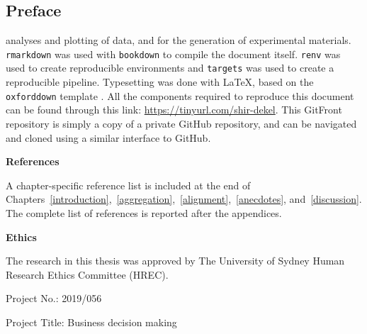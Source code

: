 \documentclass[a4paper, nobind]{templates/ociamthesis}
\newenvironment{preface}%
{   \begin{alwayssingle}\chapter*{Preface}
    \thispagestyle{empty}
    \pagestyle{empty}
    \setlength{\baselineskip}{\frontmatterbaselineskip}
  }
  {\end{alwayssingle}}
\theoremstyle{definition}
\theoremstyle{definition}
\theoremstyle{definition}
\theoremstyle{definition}
\theoremstyle{remark}
\begin{document}
\begin{romanpages}
\begin{preface}
  analyses and plotting of data, and for the generation of experimental materials.
  \texttt{rmarkdown} \autocite{xie2018} was used with \texttt{bookdown} \autocite{xie2016} to compile the
  document itself. \texttt{renv} \autocite{ushey2021} was used to create reproducible
  environments and \texttt{targets} \autocite{landau2021} was used to create a reproducible
  pipeline. Typesetting was done with \LaTeX, based on the \texttt{oxforddown} template
  \autocite{lyngs2019}. All the components required to reproduce this document can be
  found through this link: \url{https://tinyurl.com/shir-dekel}. This GitFront
  repository is simply a copy of a private GitHub repository, and can be navigated
  and cloned using a similar interface to GitHub.

  \hfill\break

  \noindent \textbf{References}

  A chapter-specific reference list is included at the end of
  Chapters~\ref{introduction},~\ref{aggregation},~\ref{alignment},~\ref{anecdotes},
  and~\ref{discussion}. The complete list of references is reported after the
  appendices.

  \hfill\break

  \noindent \textbf{Ethics}

  The research in this thesis was approved by The University of Sydney Human
  Research Ethics Committee (HREC).

  Project No.: 2019/056

  Project Title: Business decision making
\end{preface}


\end{romanpages}
\end{document}
